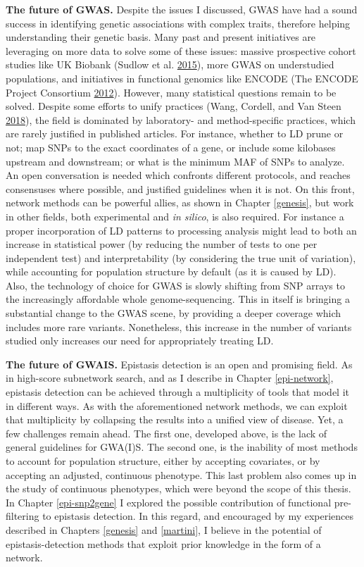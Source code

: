 \documentclass[
  11pt,
]{env/yjiao}
\begin{document}
\textbf{The future of GWAS.} Despite the issues I discussed, GWAS have had a sound success in identifying genetic associations with complex traits, therefore helping understanding their genetic basis. Many past and present initiatives are leveraging on more data to solve some of these issues: massive prospective cohort studies like UK Biobank (Sudlow et al. \protect\hyperlink{ref-sudlow_uk_2015}{2015}), more GWAS on understudied populations, and initiatives in functional genomics like ENCODE (The ENCODE Project Consortium \protect\hyperlink{ref-the_encode_project_consortium_integrated_2012}{2012}). However, many statistical questions remain to be solved. Despite some efforts to unify practices (Wang, Cordell, and Van Steen \protect\hyperlink{ref-wang_statistical_2018}{2018}), the field is dominated by laboratory- and method-specific practices, which are rarely justified in published articles. For instance, whether to LD prune or not; map SNPs to the exact coordinates of a gene, or include some kilobases upstream and downstream; or what is the minimum MAF of SNPs to analyze. An open conversation is needed which confronts different protocols, and reaches consensuses where possible, and justified guidelines when it is not. On this front, network methods can be powerful allies, as shown in Chapter \ref{genesis}, but work in other fields, both experimental and \emph{in silico}, is also required. For instance a proper incorporation of LD patterns to processing analysis might lead to both an increase in statistical power (by reducing the number of tests to one per independent test) and interpretability (by considering the true unit of variation), while accounting for population structure by default (as it is caused by LD). Also, the technology of choice for GWAS is slowly shifting from SNP arrays to the increasingly affordable whole genome-sequencing. This in itself is bringing a substantial change to the GWAS scene, by providing a deeper coverage which includes more rare variants. Nonetheless, this increase in the number of variants studied only increases our need for appropriately treating LD.

\textbf{The future of GWAIS.} Epistasis detection is an open and promising field. As in high-score subnetwork search, and as I describe in Chapter \ref{epi-network}, epistasis detection can be achieved through a multiplicity of tools that model it in different ways. As with the aforementioned network methods, we can exploit that multiplicity by collapsing the results into a unified view of disease. Yet, a few challenges remain ahead. The first one, developed above, is the lack of general guidelines for GWA(I)S. The second one, is the inability of most methods to account for population structure, either by accepting covariates, or by accepting an adjusted, continuous phenotype. This last problem also comes up in the study of continuous phenotypes, which were beyond the scope of this thesis. In Chapter \ref{epi-snp2gene} I explored the possible contribution of functional pre-filtering to epistasis detection. In this regard, and encouraged by my experiences described in Chapters \ref{genesis} and \ref{martini}, I believe in the potential of epistasis-detection methods that exploit prior knowledge in the form of a network.
\end{document}
